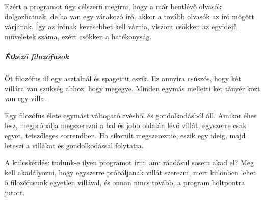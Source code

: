 \documentclass[fleqn,10pt,a4paper]{article}
\theoremstyle{magyar}
\begin{document}
  Ezért a programot úgy célszerű megírni, hogy a már bentlévő olvasók
  dolgozhatnak, de ha van egy várakozó író, akkor a tovább olvasók az
  író mögött várjanak. Így az írónak kevesebbet kell várnia, viszont
  csökken az egyidejű műveletek száma, ezért csökken a hatékonyság.
  
  \subparagraph{Étkező filozófusok}
  Öt filozófus ül egy asztalnál és spagettit eszik. Ez annyira
  csúszós, hogy két villára van szükség ahhoz, hogy megegye. Minden
  egymás melletti két tányér közt van egy villa. 

  Egy filozófus élete egymást váltogató evésből és gondolkodásból
  áll. Amikor éhes lesz, megpróbálja megszerezni a bal és jobb oldalán
  lévő villát, egyszerre csak egyet, tetszőleges sorrendben. Ha
  sikerült megszereznie, eszik egy ideig, majd leteszi a villákat és
  gondolkodással folytatja.

  A kulcskérdés: tudunk-e ilyen programot  írni, ami ráadásul sosem
  akad el? Meg kell akadályozni, hogy egyszerre próbáljanak villát
  szerezni, mert különben lehet $5$ filozófusunk egyetlen villával, és
  onnan nincs tovább, a program holtpontra jutott.
\end{document}
